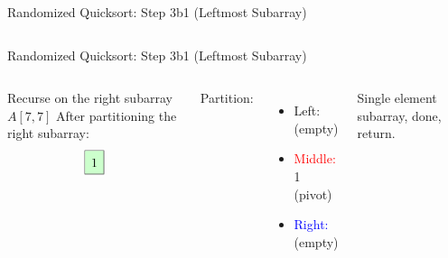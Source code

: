 \begin{frame}{Randomized Quicksort: Step 3b1 (Leftmost Subarray)}
\begin{columns}[t]
\begin{minipage}[t]{\linewidth}
\begin{center}
      \end{center}
    \end{minipage}
  \end{columns}
\end{frame}
\begin{frame}{Randomized Quicksort: Step 3b1 (Leftmost Subarray)}
  \begin{columns}[t]
    Recurse on the right subarray $A[7,7]$
    After partitioning the right subarray:
    \[
      \renewcommand{\arraystretch}{1.5}
      \begin{array}{|c|c|c|}
        \hline
        \cellcolor{green!20}{1} \\
        \hline
      \end{array}
    \]

    Partition:
    \begin{itemize}
      \item \textcolor{green!60!black}{Left:} (empty)
      \item \textcolor{red}{Middle:} 1 (pivot)
      \item \textcolor{blue}{Right:} (empty)
    \end{itemize}
    Single element subarray, done, return.
    \begin{minipage}[t]{\linewidth}
      \vspace{0pt} %
      \begin{center}


\end{center}
\end{minipage}
\end{columns}
\end{frame}
